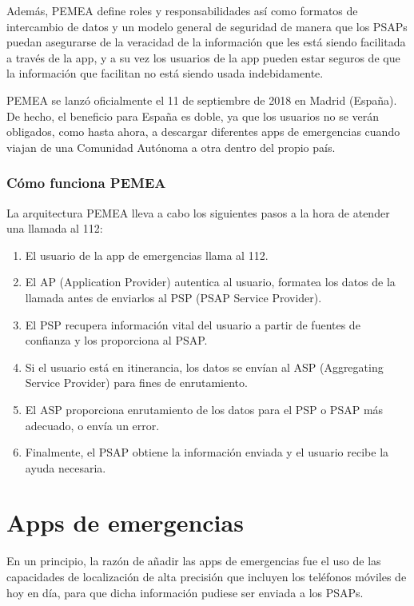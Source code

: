 Además, PEMEA define roles y responsabilidades así como formatos de intercambio de datos y un modelo general de seguridad de manera que los PSAPs puedan asegurarse de la veracidad de la información que les está siendo facilitada a través de la app, y a su vez los usuarios de la app pueden estar seguros de que la información que facilitan no está siendo usada indebidamente.

PEMEA se lanzó oficialmente el 11 de septiembre de 2018 en Madrid (España). De hecho, el beneficio para España es doble, ya que los usuarios no se verán obligados, como hasta ahora, a descargar diferentes apps de emergencias cuando viajan de una Comunidad Autónoma a otra dentro del propio país.

\subsubsection{Cómo funciona PEMEA}

La arquitectura PEMEA lleva a cabo los siguientes pasos a la hora de atender una llamada al 112:

\begin{enumerate}
  \item El usuario de la app de emergencias llama al 112.
  \item El AP (Application Provider) autentica al usuario, formatea los datos de la llamada antes de enviarlos al PSP (PSAP Service Provider).
  \item El PSP recupera información vital del usuario a partir de fuentes de confianza y los proporciona al PSAP.
  \item Si el usuario está en itinerancia, los datos se envían al ASP (Aggregating Service Provider) para fines de enrutamiento.
  \item El ASP proporciona enrutamiento de los datos para el PSP o PSAP más adecuado, o envía un error.
  \item Finalmente, el PSAP obtiene la información enviada y el usuario recibe la ayuda necesaria.
\end{enumerate}

\section{Apps de emergencias}

En un principio, la razón de añadir las apps de emergencias fue el uso de las capacidades de localización de alta precisión que incluyen los teléfonos móviles de hoy en día, para que dicha información pudiese ser enviada a los PSAPs.

